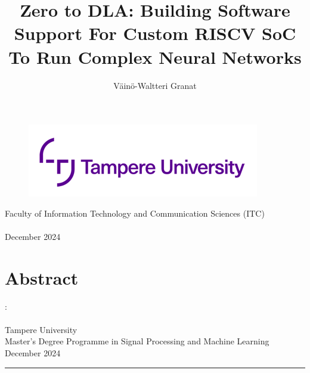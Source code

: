 \documentclass[12pt,a4paper,english
]{tunithesis}
\author{Väinö-Waltteri Granat}
\title{Zero to DLA: Building Software Support For Custom RISCV SoC To Run Complex Neural Networks} %
\begin{document}
\makeatletter

\thispagestyle{empty}
\vspace*{-.5cm}\noindent

\begin{figure}
    \vspace{-1.3cm}
    \advance\leftskip-2.5cm
    \noindent\includegraphics{img/tunilogo.png}
\end{figure}
 
\vspace{2.5cm}
\begin{flushright}
\noindent\textsf{\LARGE{\@author}}

\noindent\vspace{0.5cm}

\noindent\Huge{\textsf{\textbf{\textcolor{tunipurple}{\@title}}}}
\end{flushright}
\vspace{10.7cm} %

\begin{flushright}  
    \begin{spacing}{1.0}
      \textsf{Faculty of Information Technology and Communication Sciences (ITC)\\
      \@thesistype\\
      December 2024}
    \end{spacing}
\end{flushright}

\if@twoside
\clearpage
\fi


\chapter*{Abstract}

\begin{spacing}{1.0}
\noindent \@author: \@title\\
\@thesistype\\
Tampere University\\
Master’s Degree Programme in Signal Processing and Machine Learning\\
December 2024
\end{spacing}
\noindent\rule{12cm}{0.4pt}
\end{document}
